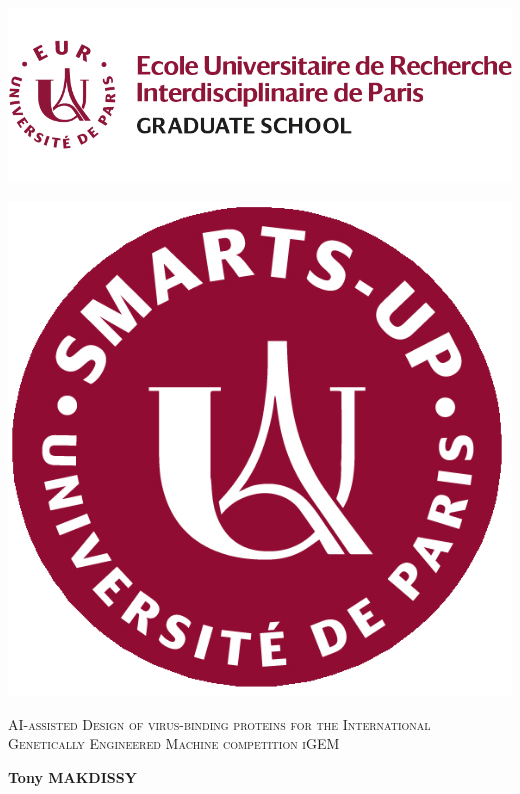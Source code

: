 \documentclass[11pt,a4paper]{article}
\begin{document}
\begin{titlepage}
\begin{minipage}{0.25\textwidth}
    \end{minipage}
    \begin{minipage}{0.25\textwidth}
        \includegraphics[width=\linewidth]{Logos/EURIP logo.png}\par\vspace{1cm}
        \includegraphics[width=\linewidth]{Logos/SmartUP_1920-1 (1).png}\par\vspace{1cm}
    \end{minipage}

    {\scshape\Large AI-assisted Design of virus-binding proteins for the International
    Genetically Engineered Machine competition iGEM \par}
    \vspace{1cm}

    {\huge\bfseries Tony MAKDISSY \par}
    \vspace{1cm}


\end{titlepage}
\end{document}

